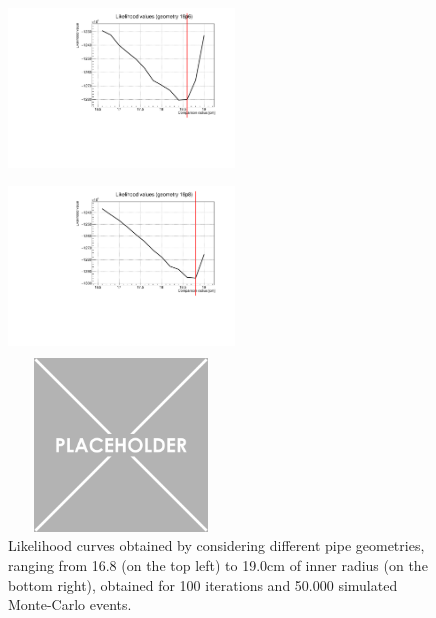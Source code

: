 \documentclass[a4paper, 11pt]{report}
\begin{document}
\begin{figure}[htbp]
\begin{minipage}[b]{.32\textwidth}
\includegraphics[width=6cm, height=4.6cm]{figs/likelihood100HighStat/likelihood18p6.pdf}
\end{minipage}\hfill
\begin{minipage}[b]{.32\textwidth}
\includegraphics[width=6cm, height=4.6cm]{figs/likelihood100HighStat/likelihood18p8.pdf}
\end{minipage} \hfill
\begin{minipage}[b]{.32\textwidth}
\includegraphics[width=6cm, height=4.6cm]{figs/placeholder.png}
\end{minipage} \hfill
\caption{Likelihood curves obtained by considering different pipe geometries, ranging from 16.8 (on the top left) to 19.0cm of inner radius (on the bottom right), obtained for 100 iterations and 50.000 simulated Monte-Carlo events.}
\label{fig:likelihoods2}
\end{figure}
\end{document}
